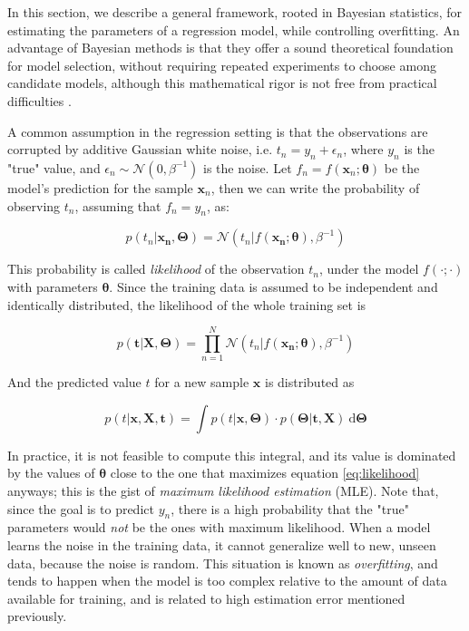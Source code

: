 \documentclass[12pt]{book}
\begin{document}
In this section, we describe a general framework, rooted in Bayesian statistics, for estimating the parameters of a regression model, while controlling overfitting. An advantage of Bayesian methods is that they offer a sound theoretical foundation for model selection, without requiring repeated experiments to choose among candidate models, although this mathematical rigor is not free from practical difficulties \citep{bayesian_model_selection, practical_bayesian_model_selection}.

A common assumption in the regression setting is that the observations are corrupted by additive Gaussian white noise, i.e. $t_n=y_n+\epsilon_n$, where $y_n$ is the "true" value, and $\epsilon_n\sim\mathcal{N}(0,\beta^{-1})$ is the noise. Let $f_n=f(\bm x_n;\bm{\theta})$ be the model's prediction for the sample $\bm x_n$, then we can write the probability of observing $t_n$, assuming that $f_n=y_n$, as:

\begin{equation}
p(t_n\vert \bm{x_n},\bm\Theta)=\mathcal{N}(t_n\vert f(\bm{x_n};\bm\theta),\beta^{-1})
\end{equation}

This probability is called \emph{likelihood} of the observation $t_n$, under the model $f(\cdot;\cdot)$ with parameters $\bm{\theta}$. Since the training data is assumed to be independent and identically distributed, the likelihood of the whole training set is

\begin{equation}
\label{eq:likelihood}
p(\bm{t}\vert\bm{X}, \bm\Theta)=\prod_{n=1}^N  \mathcal{N}(t_n\vert f(\bm{x_n};\bm\theta),\beta^{-1})
\end{equation}

And the predicted value $t$ for a new sample $\bm x$ is distributed as

\begin{equation}
p(t\vert \bm x, \bm X, \bm t)=\int
p(t\vert\bm x,\bm\Theta)\cdot p(\bm\Theta\vert \bm t, \bm X)\ \text{d}\bm\Theta 
\end{equation}

In practice, it is not feasible to compute this integral, and its value is dominated by the values of $\bm\theta$ close to the one that maximizes equation \ref{eq:likelihood} anyways; this is the gist of \emph{maximum likelihood estimation} (MLE). Note that, since the goal is to predict $y_n$, there is a high probability that the "true" parameters would \emph{not} be the ones with maximum likelihood. When a model learns the noise in the training data, it cannot generalize well to new, unseen data, because the noise is random. This situation is known as \emph{overfitting}, and tends to happen when the model is too complex relative to the amount of data available for training, and is related to high estimation error mentioned previously.
\end{document}
